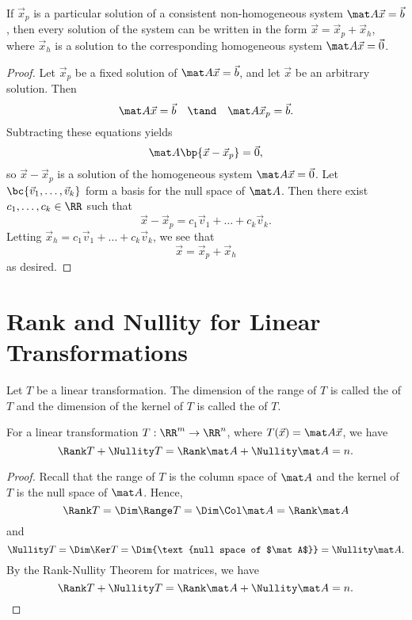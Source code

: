 \begin{proposition}
    If $\vec x_p$ is a particular solution of a consistent non-homogeneous system $\mat A \vec x = \vec b$, then every solution of the system can be written in the form $\vec x = \vec x_p + \vec x_h$, where $\vec x_h$ is a solution to the corresponding homogeneous system $\mat A \vec x = \vec 0$.
\end{proposition}
\begin{proof}
    Let $\vec x_p$ be a fixed solution of $\mat A \vec x = \vec b$, and let $\vec x$ be an arbitrary solution. Then \[\mat A \vec x = \vec b \quad \tand \quad \mat A \vec x_p = \vec b.\] Subtracting these equations yields \[\mat A \bp{\vec x - \vec x_p} = \vec 0,\] so $\vec x - \vec x_p$ is a solution of the homogeneous system $\mat A \vec x = \vec 0$. Let $\bc{\vec v_1, \dots, \vec v_k}$ form a basis for the null space of $\mat A$. Then there exist $c_1, \dots, c_k \in \RR$ such that \[\vec x - \vec x_p = c_1 \vec v_1 + \dots + c_k \vec v_k.\] Letting $\vec x_h = c_1 \vec v_1 + \dots + c_k \vec v_k$, we see that \[\vec x = \vec x_p + \vec x_h\] as desired.
\end{proof}

\section{Rank and Nullity for Linear Transformations}

\begin{definition}
    Let $T$ be a linear transformation. The dimension of the range of $T$ is called the  of $T$ and the dimension of the kernel of $T$ is called the  of $T$.
\end{definition}

\begin{theorem}
    For a linear transformation $T : \RR^m \to \RR^n$, where $T(\vec x) = \mat A \vec x$, we have \[\Rank T + \Nullity T = \Rank \mat A + \Nullity \mat A = n.\]
\end{theorem}
\begin{proof}
    Recall that the range of $T$ is the column space of $\mat A$ and the kernel of $T$ is the null space of $\mat A$. Hence, \[\Rank T = \Dim \Range T = \Dim \Col \mat A = \Rank \mat A\] and \[\Nullity T = \Dim \Ker T = \Dim{\text{null space of $\mat A$}} = \Nullity \mat A.\] By the Rank-Nullity Theorem for matrices, we have \[\Rank T + \Nullity T = \Rank \mat A + \Nullity \mat A = n.\]
\end{proof}